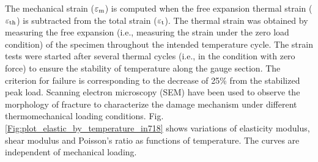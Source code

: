 \documentclass[preprint,5p,twocolumn,11pt,sort&compress]{elsarticle}
\begin{document}

The mechanical strain ($\varepsilon_{\rm m}$) is computed when the free expansion thermal strain ($\varepsilon_{\rm th}$) is subtracted from the total strain ($\varepsilon_{\rm t}$). The thermal strain was obtained by measuring the free expansion (i.e., measuring the strain under the zero load condition) of the specimen throughout the intended temperature cycle. The strain tests were started after several thermal cycles (i.e., in the condition with zero force) to ensure the stability of temperature along the gauge section.
The criterion for failure is corresponding to the decrease of 25\% from the stabilized peak load. Scanning electron microscopy (SEM) have been used to observe the morphology of fracture to characterize the damage mechanism under different thermomechanical loading conditions.
Fig. \ref{Fig:plot_elastic_by_temperature_in718} shows variations of elasticity modulus, shear modulus and Poisson's ratio as functions of temperature. The curves are independent of mechanical loading.
\end{document}
